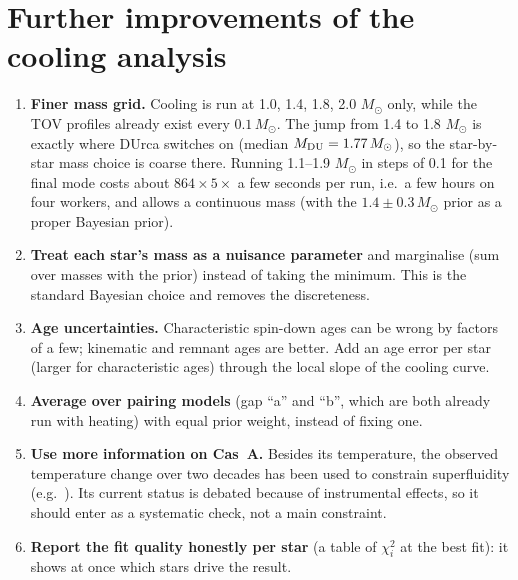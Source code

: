 \documentclass[11pt,a4paper]{article}
\newcommand{\Msun}{M_\odot}
\begin{document}
\section{Further improvements of the cooling analysis}
\begin{enumerate}[leftmargin=*]
\item \textbf{Finer mass grid.} Cooling is run at 1.0, 1.4, 1.8, 2.0 $\Msun$ only, while the TOV profiles already exist every $0.1\,\Msun$. The jump from 1.4 to 1.8 $\Msun$ is exactly where DUrca switches on (median $M_{\rm DU}=1.77\,\Msun$), so the star-by-star mass choice is coarse there. Running 1.1--1.9 $\Msun$ in steps of 0.1 for the final mode costs about $864\times5\times$ a few seconds per run, i.e.\ a few hours on four workers, and allows a continuous mass (with the $1.4\pm0.3\,\Msun$ prior as a proper Bayesian prior).
\item \textbf{Treat each star's mass as a nuisance parameter} and marginalise (sum over masses with the prior) instead of taking the minimum. This is the standard Bayesian choice and removes the discreteness.
\item \textbf{Age uncertainties.} Characteristic spin-down ages can be wrong by factors of a few; kinematic and remnant ages are better. Add an age error per star (larger for characteristic ages) through the local slope of the cooling curve.
\item \textbf{Average over pairing models} (gap ``a'' and ``b'', which are both already run with heating) with equal prior weight, instead of fixing one.
\item \textbf{Use more information on Cas~A.} Besides its temperature, the observed temperature change over two decades has been used to constrain superfluidity (e.g.\ \cite{Shternin2011,Ho2015}). Its current status is debated because of instrumental effects, so it should enter as a systematic check, not a main constraint.
\item \textbf{Report the fit quality honestly per star} (a table of $\chi^2_i$ at the best fit): it shows at once which stars drive the result.
\end{enumerate}

\end{document}

